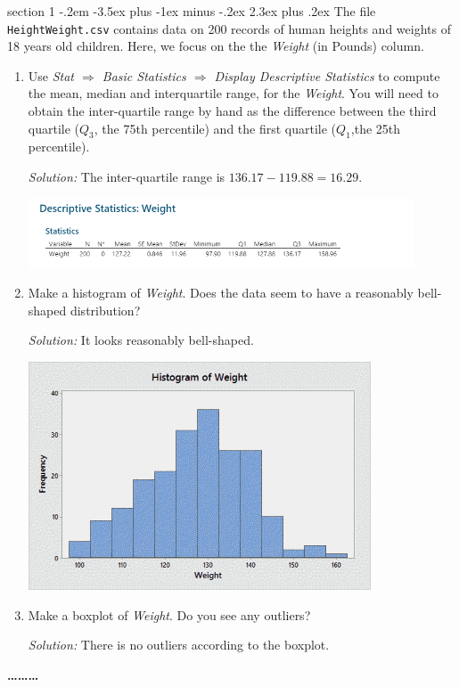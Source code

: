 \documentclass[11pt]{article}
\makeatletter
\newenvironment{problem}{\@startsection
       {section}
       {1}
       {-.2em}
       {-3.5ex plus -1ex minus -.2ex}
       {2.3ex plus .2ex}
       {\pagebreak[3]%
       \large\bf\noindent{Problem }
       }
       }
       {%
       \begin{center}\large\bf \ldots\ldots\ldots\end{center}}
\makeatother
\begin{document}
\begin{problem}{}
The file \texttt{HeightWeight.csv} contains data on 200  records of human heights and weights of 18 years old children.   Here, we focus on the the \textit{Weight} (in Pounds) column.
\begin{enumerate}

\item Use
%
\textit{Stat $\Rightarrow$
        Basic Statistics $\Rightarrow$
        Display Descriptive Statistics}
%
to compute the mean, median and interquartile range, for the \textit{Weight}.  You will need to obtain the inter-quartile range by hand as the difference between the third quartile ($Q_3$, the 75th percentile) and the first quartile ($Q_1$,the 25th percentile). 


\vspace{0.2cm}
\textit{Solution:} The inter-quartile range is $136.17-119.88=16.29$.

\includegraphics[width=0.9\textwidth]{q31.png}


\item Make a histogram of \textit{Weight}.  Does the data seem to have a reasonably bell-shaped distribution?  

\vspace{0.2cm}
\textit{Solution:} It looks reasonably bell-shaped.

\includegraphics[width=0.8\textwidth]{q32.png}
\item Make a boxplot of \textit{Weight}.  Do you see any outliers?

\vspace{0.2cm}
\textit{Solution:} There is no outliers according to the boxplot.


\end{enumerate}
\end{problem}
\end{document}
